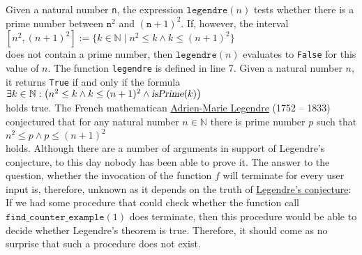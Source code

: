 Given a natural number \texttt{n}, the expression
$\texttt{legendre}(n)$ tests whether there is a prime number between $\texttt{n}^2$ and $(\texttt{n}+1)^2$.  
If, however, the interval
\\[0.2cm]
\hspace*{1.3cm}
$[n^2, (n+1)^2] := \{ k \in \mathbb{N} \mid n^2 \leq k \wedge k \leq (n+1)^2 \}$
\\[0.2cm]
does not contain a prime number, then $\texttt{legendre}(n)$ evaluates
to \texttt{False} for this value of $n$.  The function \texttt{legendre} is defined in line 7.  
Given a natural number $n$, it returns \texttt{True} if and only if the formula
\\[0.2cm]
\hspace*{1.3cm}
$\exists k \in \mathbb{N}:\bigl( n^2 \leq k \wedge k \leq (n+1)^2 \wedge \textsl{isPrime}(k)\bigr)$
\\[0.2cm]
holds true.  The French mathematican 
\href{http://en.wikipedia.org/wiki/Adrien-Marie_Legendre}{Adrien-Marie Legendre} (1752 -- 1833) conjectured that
for any natural number $n \in \mathbb{N}$ there is prime number $p$ such that
\\[0.2cm]
\hspace*{1.3cm}
$n^2 \leq p \wedge  p \leq (n+1)^2$
\\[0.2cm]
holds.  Although there are a number of arguments in support of Legendre's conjecture,  to this day
nobody has been able to prove it.  The answer to the question, whether the invocation of the function $f$ will
terminate for every user input is, therefore, unknown as it depends on the truth of 
\href{http://en.wikipedia.org/wiki/Legendre's_conjecture}{Legendre's conjecture}:  If we
had some procedure that could check whether the function call $\texttt{find\_counter\_example}(1)$ does terminate,
then this procedure would be able to decide whether Legendre's theorem is true.  Therefore, it
should come as no surprise that such a procedure does not exist.


